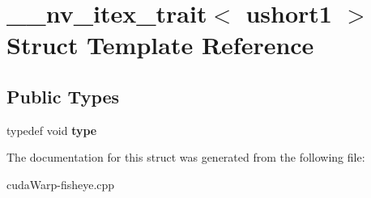 \hypertarget{struct____nv__itex__trait_3_01ushort1_01_4}{}\section{\+\_\+\+\_\+nv\+\_\+itex\+\_\+trait$<$ ushort1 $>$ Struct Template Reference}
\label{struct____nv__itex__trait_3_01ushort1_01_4}
\subsection*{Public Types}
\begin{DoxyCompactItemize}
\item 
typedef void {\bfseries type}\hypertarget{struct____nv__itex__trait_3_01ushort1_01_4_a3a89cb2526bdc817774850db4334933a}{}\label{struct____nv__itex__trait_3_01ushort1_01_4_a3a89cb2526bdc817774850db4334933a}

\end{DoxyCompactItemize}


The documentation for this struct was generated from the following file\+:\begin{DoxyCompactItemize}
\item 
cuda\+Warp-\/fisheye.\+cpp\end{DoxyCompactItemize}
